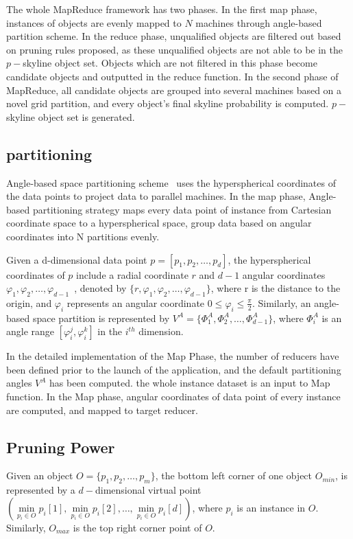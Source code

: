 The whole MapReduce framework has two phases. In the first map phase, instances of objects are evenly mapped to $N$ machines through angle-based partition scheme. In the reduce phase, unqualified objects are filtered out based on pruning rules proposed, as these unqualified objects are not able to be in the $p-$skyline object set. Objects which are not filtered in this phase become candidate objects and outputted in the reduce function. In the second phase of MapReduce, all candidate objects are grouped into several machines based on a novel grid partition, and every object's final skyline probability is computed. $p-$skyline object set is generated.

\subsection{partitioning}

Angle-based space partitioning scheme~\cite{ref:AngularPartition} uses the hyperspherical coordinates of the data points to project data to parallel machines. In the map phase, Angle-based partitioning strategy maps every data point of instance from Cartesian coordinate space to a hyperspherical space, group data based on angular coordinates into N partitions evenly. 

Given a d-dimensional data point $p = [p_1, p_2, \dots, p_d]$, the hyperspherical coordinates of $p$ include a radial coordinate $r$ and $d-1$ angular coordinates $\varphi_1, \varphi_2, \dots, \varphi_{d-1}$~\cite{ref:AngularPartition}, denoted by $\{r, \varphi_1, \varphi_2, \dots, \varphi_{d-1}\}$, where r is the distance to the origin, and $\varphi_i$ represents an angular coordinate $ 0 \leq  \varphi_i \leq \frac{\pi}{2}$. Similarly, an angle-based space partition is represented by $V^A = \{\Phi_1^A, \Phi_2^A, \dots, \Phi_{d-1}^A \}$, where $\Phi_i^A$ is an angle range $[\varphi_i^j,\varphi_i^k]$ in the $i^{th}$ dimension.

In the detailed implementation of the Map Phase, the number of reducers have been defined prior to the launch of the application, and the default partitioning angles $V^A$ has been computed. the whole instance dataset is an input to Map function. In the Map phase, angular coordinates of data point of every instance are computed, and mapped to target reducer.

\subsection{Pruning Power}
Given an object $O = \{p_1, p_2, \dots, p_m\}$, the bottom left corner of one object $O_{min}$, is represented by a $d-$dimensional virtual point $( \min\limits_{p_i \in O}p_i[1], \min\limits_{p_i \in O}p_i[2], \dots, \min\limits_{p_i \in O}p_i[d])$, where $p_i$ is an instance in $O$. Similarly, $O_{max}$ is the top right corner point of $O$.

